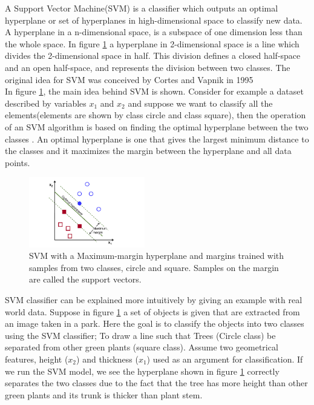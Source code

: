 A Support Vector Machine(SVM) is a classifier which outputs an optimal hyperplane or set of hyperplanes in high-dimensional space to classify new data. A hyperplane in a n-dimensional space, is a subspace of one dimension less than the whole space. In figure \ref{fig:SVM} a hyperplane in 2-dimensional space is a line which divides the 2-dimensional space in half. This division defines a closed half-space and an open half-space, and represents the division between two classes. The original idea for SVM was conceived by Cortes and Vapnik in 1995 \cite{cortes1995support} \\
In figure \ref{fig:SVM}, the main idea behind SVM is shown. Consider for example a dataset described by variables $x_1$ and $x_2$ and suppose we want to classify all the elements(elements are shown by class circle and class square), then the operation of an SVM algorithm is based on finding the optimal hyperplane between the two classes \cite{opencv_library}. An optimal hyperplane is one that gives the largest minimum distance to the classes and it maximizes the margin between the hyperplane and all data points. %

\begin{figure}[H]
    \includegraphics[width=0.45\textwidth]{./img/SVM.png}
    \caption{\footnotesize{SVM with a Maximum-margin hyperplane and margins trained with samples from two classes, circle and square. Samples on the margin are called the support vectors.\cite{wiki:SVM}}}
    \label{fig:SVM}
\end{figure}

SVM classifier can be explained more intuitively by giving an example with real world data. Suppose in figure \ref{fig:SVM} a set of objects is given that are extracted from an image taken in a park. Here the goal is to classify the objects into two classes using the SVM classifier; To draw a line such that Trees (Circle class) be separated from other  green plants (square class). Assume two geometrical features, height ($x_2$) and thickness ($x_1$)  used as an argument for classification. If we run the SVM model, we see the hyperplane shown in figure \ref{fig:SVM} correctly separates the two classes due to the fact that the tree has more height than other green plants and its trunk is thicker than plant stem.\\  


